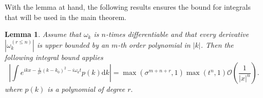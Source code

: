 \documentclass[notitlepage, prx, preprint, amsmath,superscriptaddress,amssymb]{revtex4-1}
\newtheorem{lemma}{Lemma}[section]
\begin{document}
%


With the lemma at hand, the following results ensures the bound for integrals that will be used in the main theorem.

\begin{lemma}
\label{lemma:bounds}
Assume that $\omega_k$ is $n$-times differentiable and  that every derivative $|\omega_k^{(r\leq n)}|$ is upper bounded by an $m$-th order polynomial in $|k|$. Then the following integral bound applies
\begin{equation}
\left|\int e^{i k x - \frac{1}{\sigma^2}{(k-k_0)^2} - i \omega_k t} p(k)\mathrm{d}k\right|
=\max(\sigma^{m+n + r},1) \max(t^n,1) \mathcal{O}\left(\frac{1}{|x|^n}\right).
\end{equation} where $p(k)$ is a polynomial of degree $r.$
\end{lemma}
\end{document}
